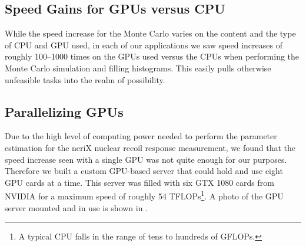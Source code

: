 









\subsection{Speed Gains for GPUs versus CPU}


While the speed increase for the Monte Carlo varies on the content and the type of CPU and GPU used, in each of our applications we saw speed increases of roughly 100--1000 times on the GPUs used versus the CPUs when performing the Monte Carlo simulation and filling histograms.  This easily pulls otherwise unfeasible tasks into the realm of possibility.


\subsection{Parallelizing GPUs}


Due to the high level of computing power needed to perform the parameter estimation for the neriX nuclear recoil response measurement, we found that the speed increase seen with a single GPU was not quite enough for our purposes.  Therefore we built a custom GPU-based server that could hold and use eight GPU cards at a time.  This server was filled with six GTX 1080 cards from NVIDIA \cite{nvidia_gtx_manual} for a maximum speed of roughly 54 TFLOPs\footnote{A typical CPU falls in the range of tens to hundreds of GFLOPs.}.  A photo of the GPU server mounted and in use is shown in .

